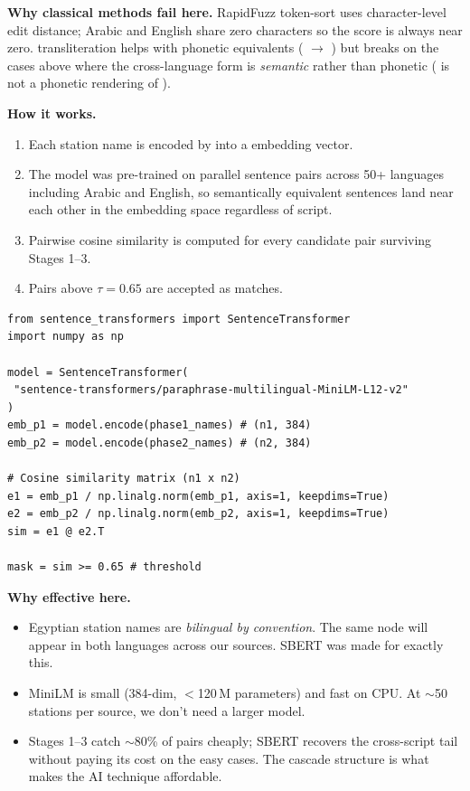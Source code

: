 \textbf{Why classical methods fail here.} RapidFuzz token-sort uses
character-level edit distance; Arabic and English share zero
characters so the score is always near zero. 
transliteration helps with phonetic equivalents ( $\to$
) but breaks on the cases above where the cross-language
form is \emph{semantic} rather than phonetic
( is not a phonetic rendering of
).

\textbf{How it works.}
\begin{enumerate}
 \item Each station name is encoded by
 into a  embedding vector.
 \item The model was pre-trained on parallel sentence pairs across 50+
 languages including Arabic and English, so semantically
 equivalent sentences land near each other in the embedding
 space regardless of script.
 \item Pairwise cosine similarity is computed for every candidate
 pair surviving Stages 1--3.
 \item Pairs above $\tau = 0.65$ are accepted as matches.
\end{enumerate}

\begin{lstlisting}[caption={Stage-4 SBERT matching, simplified.}]
from sentence_transformers import SentenceTransformer
import numpy as np

model = SentenceTransformer(
 "sentence-transformers/paraphrase-multilingual-MiniLM-L12-v2"
)
emb_p1 = model.encode(phase1_names) # (n1, 384)
emb_p2 = model.encode(phase2_names) # (n2, 384)

# Cosine similarity matrix (n1 x n2)
e1 = emb_p1 / np.linalg.norm(emb_p1, axis=1, keepdims=True)
e2 = emb_p2 / np.linalg.norm(emb_p2, axis=1, keepdims=True)
sim = e1 @ e2.T

mask = sim >= 0.65 # threshold
\end{lstlisting}

\textbf{Why effective here.}
\begin{itemize}
 \item Egyptian station names are \emph{bilingual by convention}. The same node will appear in both languages across our sources.
 SBERT was made for exactly this.
 \item MiniLM is small (384-dim, $<$120\,M parameters) and fast on CPU. At $\sim$50 stations per source, we don't need a larger model.
 \item Stages 1--3 catch $\sim$80\% of pairs cheaply; SBERT recovers
 the cross-script tail without paying its cost on the easy
 cases. The cascade structure is what makes the AI technique
 affordable.
\end{itemize}

